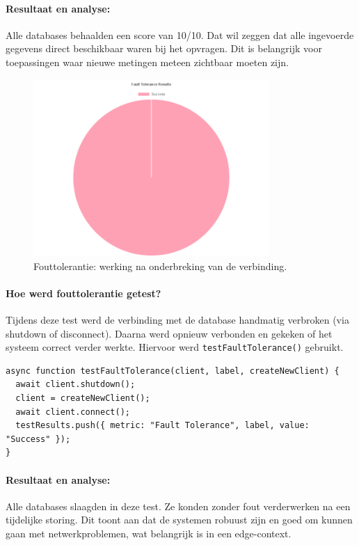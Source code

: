 \paragraph{Resultaat en analyse:}
Alle databases behaalden een score van 10/10. Dat wil zeggen dat alle ingevoerde gegevens direct beschikbaar waren bij het opvragen. Dit is belangrijk voor toepassingen waar nieuwe metingen meteen zichtbaar moeten zijn.

\begin{figure}[H]
    \centering
    \includegraphics[width=0.8\textwidth]{Fault_Tolerance.png}
    \caption{Fouttolerantie: werking na onderbreking van de verbinding.}
    \label{fig:fault-tolerance-comparison}
\end{figure}

\paragraph{Hoe werd fouttolerantie getest?}
Tijdens deze test werd de verbinding met de database handmatig verbroken (via shutdown of disconnect). Daarna werd opnieuw verbonden en gekeken of het systeem correct verder werkte. Hiervoor werd \texttt{testFaultTolerance()} gebruikt.

\begin{verbatim}
async function testFaultTolerance(client, label, createNewClient) {
  await client.shutdown();
  client = createNewClient();
  await client.connect();
  testResults.push({ metric: "Fault Tolerance", label, value: "Success" });
}
\end{verbatim}

\paragraph{Resultaat en analyse:}
Alle databases slaagden in deze test. Ze konden zonder fout verderwerken na een tijdelijke storing. Dit toont aan dat de systemen robuust zijn en goed om kunnen gaan met netwerkproblemen, wat belangrijk is in een edge-context.

